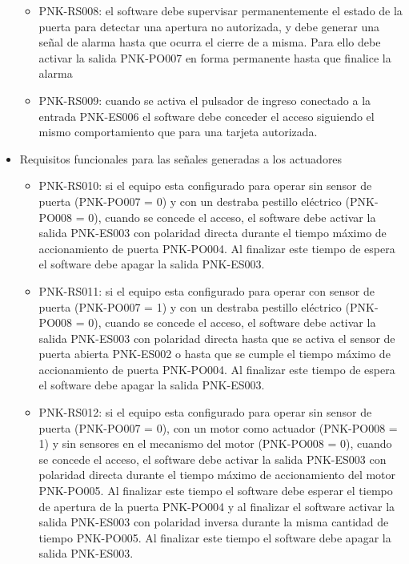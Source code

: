 \begin{itemize}
\begin{itemize}
		\item PNK-RS008: el software debe supervisar permanentemente el estado de la puerta para detectar una apertura no autorizada, y debe generar una señal de alarma hasta que ocurra el cierre de a misma. Para ello debe activar la salida PNK-PO007 en forma permanente hasta que finalice la alarma \\
	
		\item PNK-RS009: cuando se activa el pulsador de ingreso conectado a la entrada PNK-ES006 el software debe conceder el acceso siguiendo el mismo comportamiento que para una tarjeta autorizada.

	\end{itemize}

	\item Requisitos funcionales para las señales generadas a los actuadores

	\begin{itemize}
		\item PNK-RS010: si el equipo esta configurado para operar sin sensor de puerta (PNK-PO007 = 0) y con un destraba pestillo eléctrico (PNK-PO008 = 0), cuando se concede el acceso, el software debe activar la salida PNK-ES003 con polaridad directa durante el tiempo máximo de accionamiento de puerta PNK-PO004. Al finalizar este tiempo de espera el software debe apagar la salida PNK-ES003.

		\item PNK-RS011: si el equipo esta configurado para operar con sensor de puerta (PNK-PO007 = 1) y con un destraba pestillo eléctrico (PNK-PO008 = 0), cuando se concede el acceso, el software debe activar la salida PNK-ES003 con polaridad directa hasta que se activa el sensor de puerta abierta PNK-ES002 o hasta que se cumple el tiempo máximo de accionamiento de puerta PNK-PO004. Al finalizar este tiempo de espera el software debe apagar la salida PNK-ES003.
		
		\item PNK-RS012: si el equipo esta configurado para operar sin sensor de puerta (PNK-PO007 = 0), con un motor como actuador (PNK-PO008 = 1) y sin sensores en el mecanismo del motor (PNK-PO008 = 0), cuando se concede el acceso, el software debe activar la salida PNK-ES003 con polaridad directa durante el tiempo máximo de accionamiento del motor PNK-PO005. Al finalizar este tiempo el software debe esperar el tiempo de apertura de la puerta PNK-PO004 y al finalizar el software activar la salida PNK-ES003 con polaridad inversa durante la misma cantidad de tiempo PNK-PO005. Al finalizar este tiempo el software debe apagar la salida PNK-ES003.
		

\end{itemize}
\end{itemize}
